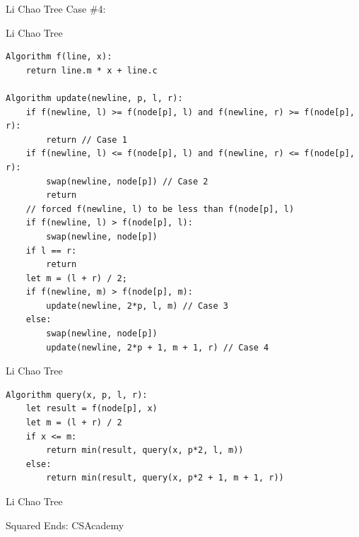 \documentclass[aspectratio=169,xcolor=dvipsnames]{beamer}
\begin{document}
\begin{frame}[t, plain]{Li Chao Tree}
Case \#4:

\begin{center}
\end{center}
\end{frame}

\begin{frame}{Li Chao Tree}
\begin{examples}
\begin{scriptsize}
\begin{verbatim}
Algorithm f(line, x):
    return line.m * x + line.c
    
Algorithm update(newline, p, l, r): 
    if f(newline, l) >= f(node[p], l) and f(newline, r) >= f(node[p], r):
        return // Case 1
    if f(newline, l) <= f(node[p], l) and f(newline, r) <= f(node[p], r):
        swap(newline, node[p]) // Case 2
        return
    // forced f(newline, l) to be less than f(node[p], l)
    if f(newline, l) > f(node[p], l):
        swap(newline, node[p])
    if l == r:
        return
    let m = (l + r) / 2;
    if f(newline, m) > f(node[p], m):
        update(newline, 2*p, l, m) // Case 3
    else:
        swap(newline, node[p])
        update(newline, 2*p + 1, m + 1, r) // Case 4
\end{verbatim}
\end{scriptsize}
\end{examples}
\end{frame}

\begin{frame}{Li Chao Tree}
\begin{examples}
\begin{scriptsize}
\begin{verbatim}
Algorithm query(x, p, l, r): 
    let result = f(node[p], x)
    let m = (l + r) / 2
    if x <= m:
        return min(result, query(x, p*2, l, m))
    else:
        return min(result, query(x, p*2 + 1, m + 1, r))
\end{verbatim}
\end{scriptsize}
\end{examples}
\end{frame}

\begin{frame}{Li Chao Tree}

\begin{center}
{\large Squared Ends: CSAcademy}

\end{center}
\end{frame}
\end{document}
